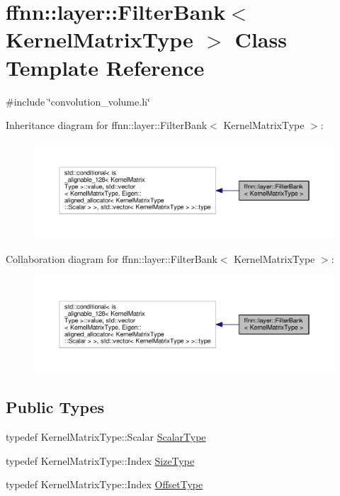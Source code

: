 \hypertarget{classffnn_1_1layer_1_1_filter_bank}{\section{ffnn\-:\-:layer\-:\-:Filter\-Bank$<$ Kernel\-Matrix\-Type $>$ Class Template Reference}
\label{classffnn_1_1layer_1_1_filter_bank}
}


{\ttfamily \#include \char`\"{}convolution\-\_\-volume.\-h\char`\"{}}



Inheritance diagram for ffnn\-:\-:layer\-:\-:Filter\-Bank$<$ Kernel\-Matrix\-Type $>$\-:\nopagebreak
\begin{figure}[H]
\begin{center}
\leavevmode
\includegraphics[width=350pt]{classffnn_1_1layer_1_1_filter_bank__inherit__graph}
\end{center}
\end{figure}


Collaboration diagram for ffnn\-:\-:layer\-:\-:Filter\-Bank$<$ Kernel\-Matrix\-Type $>$\-:\nopagebreak
\begin{figure}[H]
\begin{center}
\leavevmode
\includegraphics[width=350pt]{classffnn_1_1layer_1_1_filter_bank__coll__graph}
\end{center}
\end{figure}
\subsection*{Public Types}
\begin{DoxyCompactItemize}
\item 
typedef Kernel\-Matrix\-Type\-::\-Scalar \hyperlink{classffnn_1_1layer_1_1_filter_bank_a9520eb8417c9c124f33c1136d40842d4}{Scalar\-Type}
\item 
typedef Kernel\-Matrix\-Type\-::\-Index \hyperlink{classffnn_1_1layer_1_1_filter_bank_afd78272ebca97ce2f34596ffb9dc6cd9}{Size\-Type}
\item 
typedef Kernel\-Matrix\-Type\-::\-Index \hyperlink{classffnn_1_1layer_1_1_filter_bank_a87d15738c0864b171f2b605af7330432}{Offset\-Type}
\end{DoxyCompactItemize}

